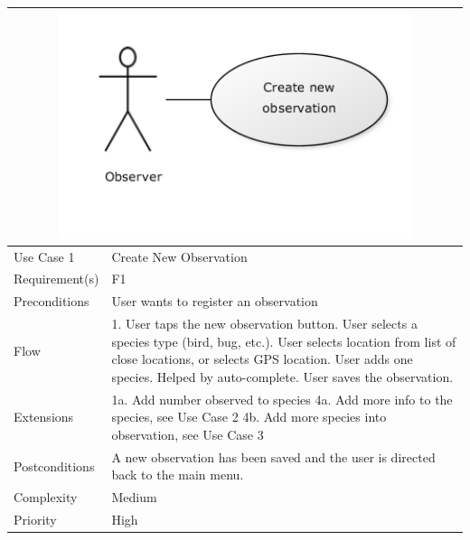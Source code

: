 \begin{tabular}[t]{|l|p{}|}
	\multicolumn{2}{c}{\includegraphics[width=0.8\textwidth]{reqspec/uc/cno.png}}\\\hline
	Use Case 1&Create New Observation\\\hline
	Requirement(s)&F1\\\hline
	Preconditions&User wants to register an observation\\\hline
	Flow&1. User taps the new observation button\newline
	2. User selects a species type (bird, bug, etc.)\newline
	3. User selects location from list of close locations, or selects GPS location\newline
	4. User adds one species. Helped by auto-complete\newline
	5. User saves the observation.\\\hline
	Extensions& 1a. Add number observed to species\newline
	4a. Add more info to the species, see Use Case 2\newline
	4b. Add more species into observation, see Use Case 3\\\hline
	Postconditions&A new observation has been saved and the user is directed back to the main menu.\\\hline
	Complexity&Medium\\\hline
	Priority&High\\\hline
\end{tabular}

\hspace{4em}


